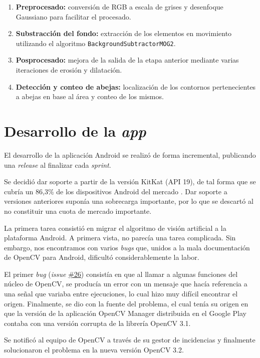 \begin{enumerate}
\def\labelenumi{\arabic{enumi}.}
\tightlist
\item
  \textbf{Preprocesado:} conversión de RGB a escala de grises y
  desenfoque Gaussiano para facilitar el procesado.
\item
  \textbf{Substracción del fondo:} extracción de los elementos en
  movimiento utilizando el algoritmo \texttt{BackgroundSubtractorMOG2}.
\item
  \textbf{Posprocesado:} mejora de la salida de la etapa anterior
  mediante varias iteraciones de erosión y dilatación.
\item
  \textbf{Detección y conteo de abejas:} localización de los contornos
  pertenecientes a abejas en base al área y conteo de los mismos.
\end{enumerate}

\section{Desarrollo de la \emph{app}}\label{desarrollo-de-la-app}

El desarrollo de la aplicación Android se realizó de forma incremental,
publicando una \emph{release} al finalizar cada \emph{sprint}.

Se decidió dar soporte a partir de la versión KitKat (API 19), de tal
forma que se cubría un 86,3\% de los dispositivos Android del mercado
\citep{android:versions}. Dar soporte a versiones anteriores suponía una 
sobrecarga importante, por lo que se descartó al no constituir una cuota de
mercado importante.

La primera tarea consistió en migrar el algoritmo de visión artificial a
la plataforma Android. A primera vista, no parecía una tarea complicada.
Sin embargo, nos encontramos con varios \emph{bugs} que, unidos a la
mala documentación de OpenCV para Android, dificultó considerablemente
la labor.

El primer \emph{bug} (\emph{issue}
\href{https://github.com/davidmigloz/go-bees/issues/26}{\#26}) consistía
en que al llamar a algunas funciones del núcleo de OpenCV, se producía
un error con un mensaje que hacía referencia a una señal que variaba
entre ejecuciones, lo cual hizo muy difícil encontrar el origen.
Finalmente, se dio con la fuente del problema, el cual tenía su origen
en que la versión de la aplicación OpenCV Manager distribuida en el
Google Play contaba con una versión corrupta de la librería OpenCV 3.1.

Se notificó al equipo de OpenCV a través de su gestor de incidencias y
finalmente solucionaron el problema en la nueva versión OpenCV 3.2.


